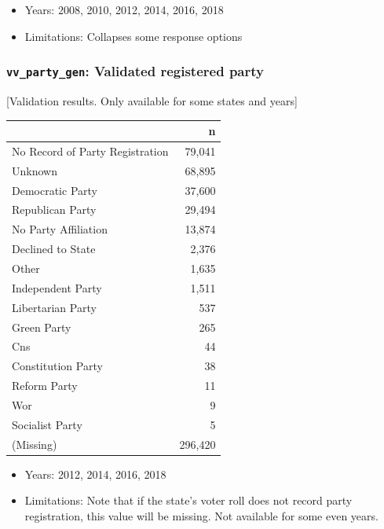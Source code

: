 \documentclass[10pt,article,oneside]{memoir}
\theoremstyle{definition}
\begin{document}
\begin{itemize}
\tightlist
\item
  Years: 2008, 2010, 2012, 2014, 2016, 2018
\item
  Limitations: Collapses some response options
\end{itemize}

\hypertarget{vv_party_gen-validated-registered-party}{%
\subsubsection{\texorpdfstring{\texttt{vv\_party\_gen}: Validated
registered
party}{vv\_party\_gen: Validated registered party}}\label{vv_party_gen-validated-registered-party}}

{[}Validation results. Only available for some states and years{]}

\begin{table}[H]
\centering
\begin{tabular}{lr}
\toprule
 & n\\
\midrule
No Record of Party Registration & 79,041\\
Unknown & 68,895\\
Democratic Party & 37,600\\
Republican Party & 29,494\\
No Party Affiliation & 13,874\\
Declined to State & 2,376\\
Other & 1,635\\
Independent Party & 1,511\\
Libertarian Party & 537\\
Green Party & 265\\
Cns & 44\\
Constitution Party & 38\\
Reform Party & 11\\
Wor & 9\\
Socialist Party & 5\\
(Missing) & 296,420\\
\bottomrule
\end{tabular}
\end{table}

\begin{itemize}
\tightlist
\item
  Years: 2012, 2014, 2016, 2018
\item
  Limitations: Note that if the state's voter roll does not record party
  registration, this value will be missing. Not available for some even
  years.
\end{itemize}
\end{document}
